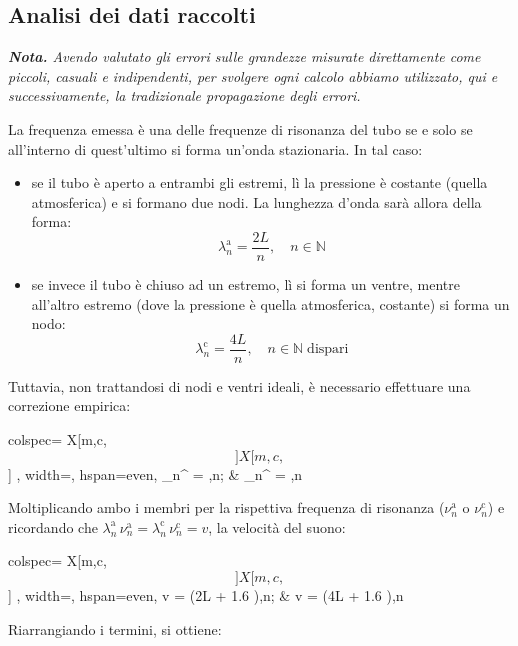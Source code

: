 \documentclass{article}
\newcommand*{\diam}{\varnothing}
\begin{document}
\subsection{Analisi dei dati raccolti}
\emph{\textbf{Nota.}
  Avendo valutato gli errori sulle grandezze misurate direttamente
  come piccoli, casuali e indipendenti, per svolgere ogni calcolo
  abbiamo utilizzato, qui e successivamente, la tradizionale
  propagazione degli errori.
}
\vspace{2mm}

La frequenza emessa è una delle frequenze di risonanza del tubo se e solo se
all'interno di quest'ultimo si forma un'onda stazionaria. In tal caso:
\begin{itemize}
  \item se il tubo è aperto a entrambi gli estremi,
    lì la pressione è costante (quella atmosferica) e si formano due nodi.
    La lunghezza d'onda sarà allora della forma:
    \[ \lambda_n^\text{a} = \frac{2L}{n},\quad n\in\mathbb{N} \]
  \item se invece il tubo è chiuso ad un estremo,
    lì si forma un ventre, mentre all'altro estremo (dove la pressione è
    quella atmosferica, costante) si forma un nodo:
    \[ \lambda_n^\text{c} = \frac{4L}{n},\quad n\in\mathbb{N}\;\text{dispari} \]
\end{itemize}

Tuttavia, non trattandosi di nodi e ventri ideali, è necessario effettuare
una correzione empirica:

\begin{center}\begin{tblr}{
  colspec={ X[m,c,$$]X[m,c,$$] },
  width=\textwidth,
  hspan=even,
}
  \lambda_n^ = \frac{2L + 1.6 \diam}{n},\quad n\in{};
  &
  \lambda_n^ = \frac{4L + 1.6 \diam}{n},\quad n\in{}\;
\end{tblr}\end{center}
Moltiplicando ambo i membri per la rispettiva frequenza di risonanza
($\nu_n^\text{a}$ o $\nu_n^\text{c}$)
e ricordando che $\lambda_n^\text{a}\,\nu_n^\text{a} =
\lambda_n^\text{c}\,\nu_n^\text{c} = v$, la velocità del suono:

\begin{center}\begin{tblr}{
  colspec={ X[m,c,$$]X[m,c,$$] },
  width=\textwidth,
  hspan=even,
}
  v = (2L + 1.6 \diam),\quad n\in{};
  &
  v = (4L + 1.6 \diam),\quad n\in{}\;
\end{tblr}\end{center}
Riarrangiando i termini, si ottiene:
\end{document}

